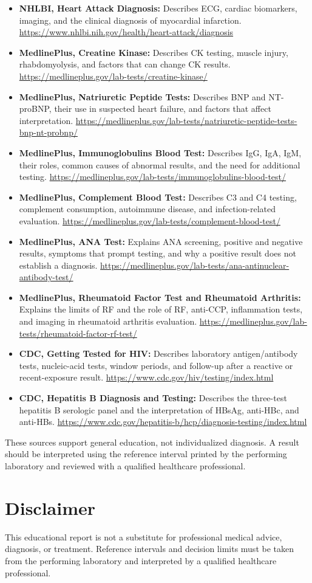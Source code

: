 \documentclass[11pt,openany]{book}
\begin{document}
\begin{itemize}[leftmargin=*]
  \item \textbf{NHLBI, Heart Attack Diagnosis:} Describes ECG, cardiac biomarkers, imaging, and the clinical diagnosis of myocardial infarction. \url{https://www.nhlbi.nih.gov/health/heart-attack/diagnosis}
  \item \textbf{MedlinePlus, Creatine Kinase:} Describes CK testing, muscle injury, rhabdomyolysis, and factors that can change CK results. \url{https://medlineplus.gov/lab-tests/creatine-kinase/}
  \item \textbf{MedlinePlus, Natriuretic Peptide Tests:} Describes BNP and NT-proBNP, their use in suspected heart failure, and factors that affect interpretation. \url{https://medlineplus.gov/lab-tests/natriuretic-peptide-tests-bnp-nt-probnp/}
  \item \textbf{MedlinePlus, Immunoglobulins Blood Test:} Describes IgG, IgA, IgM, their roles, common causes of abnormal results, and the need for additional testing. \url{https://medlineplus.gov/lab-tests/immunoglobulins-blood-test/}
  \item \textbf{MedlinePlus, Complement Blood Test:} Describes C3 and C4 testing, complement consumption, autoimmune disease, and infection-related evaluation. \url{https://medlineplus.gov/lab-tests/complement-blood-test/}
  \item \textbf{MedlinePlus, ANA Test:} Explains ANA screening, positive and negative results, symptoms that prompt testing, and why a positive result does not establish a diagnosis. \url{https://medlineplus.gov/lab-tests/ana-antinuclear-antibody-test/}
  \item \textbf{MedlinePlus, Rheumatoid Factor Test and Rheumatoid Arthritis:} Explains the limits of RF and the role of RF, anti-CCP, inflammation tests, and imaging in rheumatoid arthritis evaluation. \url{https://medlineplus.gov/lab-tests/rheumatoid-factor-rf-test/}
  \item \textbf{CDC, Getting Tested for HIV:} Describes laboratory antigen/antibody tests, nucleic-acid tests, window periods, and follow-up after a reactive or recent-exposure result. \url{https://www.cdc.gov/hiv/testing/index.html}
  \item \textbf{CDC, Hepatitis B Diagnosis and Testing:} Describes the three-test hepatitis B serologic panel and the interpretation of HBsAg, anti-HBc, and anti-HBs. \url{https://www.cdc.gov/hepatitis-b/hcp/diagnosis-testing/index.html}
\end{itemize}

These sources support general education, not individualized diagnosis. A result
should be interpreted using the reference interval printed by the performing
laboratory and reviewed with a qualified healthcare professional.
\fussy

\section{Disclaimer}
This educational report is not a substitute for professional medical advice,
diagnosis, or treatment. Reference intervals and decision limits must be taken
from the performing laboratory and interpreted by a qualified healthcare
professional.
\end{document}
